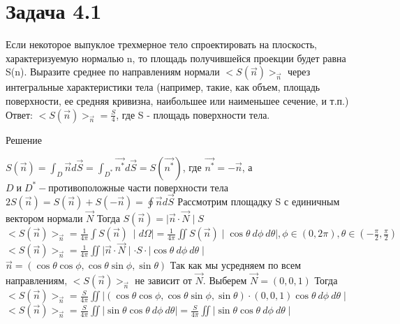 
\usepackage{lineno}

	\section{Задача 4.1}
	Если некоторое выпуклое трехмерное тело спроектировать на плоскость,
	характеризуемую нормалью n, то площадь получившейся проекции будет
	равна S(n). Выразите среднее по направлениям нормали $<S(\vec{n})>_{\vec{n}}$ через интегральные
	характеристики тела (например, такие, как объем, площадь поверхности, ее
	средняя кривизна, наибольшее или наименьшее сечение, и т.п.)
	\newline
	Ответ: $<S(\vec{n})>_{\vec{n}} = \frac{S}{4}$, где S - площадь поверхности тела.
	\begin{center}
		Решение
	\end{center}
	\linenumbers
	$S(\vec{n}) = \int_{D}^{} \vec{n} d\vec{S} = \int_{D^{*}}^{} \vec{n^{*}} d\vec{S} = S(\vec{n^{*}})$, где $\vec{n^{*}} = -\vec{n} $, 
	\newline
	а $D \; \text{и} \; D^{*} - \text{противоположные части поверхности тела}$
	\newline
	$2S(\vec{n}) = S(\vec{n})+S(-\vec{n}) = \oint \vec{n} d\vec{S} $ 
	\newline
	Рассмотрим площадку S с единичным вектором нормали $\vec{N}$
	\newline
	Тогда $S(\vec{n}) = \mid \vec{n} \cdot \vec{N} \mid S$
	\newline
	$<S(\vec{n})>_{\vec{n}} = \frac{1}{4\pi} \int S(\vec{n}) \: \mid d\Omega \mid  =\frac{1}{4\pi} \iint S(\vec{n}) \mid \cos \theta \: d\phi \: d\theta \mid , \phi \in (0, 2\pi) , \theta \in (-\frac{\pi}{2}, \frac{\pi}{2}) $
	\newline
	$<S(\vec{n})>_{\vec{n}}  =\frac{1}{4\pi} \iint \mid \vec{n} \cdot \vec{N} \mid \cdot S \cdot \mid  \cos \theta \: d\phi \: d\theta \mid $
	\newline
	$\vec{n} = (\cos \theta \cos \phi , \cos \theta \sin \phi , \sin \theta)$
	\newline
	Так как мы усредняем по всем направлениям, 	$<S(\vec{n})>_{\vec{n}}$ не зависит от $\vec{N}$. Выберем $\vec{N} = (0, 0, 1)$
	\newline
	Тогда $<S(\vec{n})>_{\vec{n}}  =\frac{S}{4\pi} \iint \mid (\cos \theta \cos \phi , \cos \theta \sin \phi , \sin \theta) \cdot (0, 0, 1)   \cos \theta \: d\phi \: d\theta \mid $
	\newline
	$<S(\vec{n})>_{\vec{n}}  =\frac{S}{4\pi} \iint \mid  \sin \theta    \cos \theta \: d\phi \: d\theta \mid = \frac{S}{4\pi} \iint \mid  \sin \theta   \cos \theta \: d\phi \: d\theta \mid $
